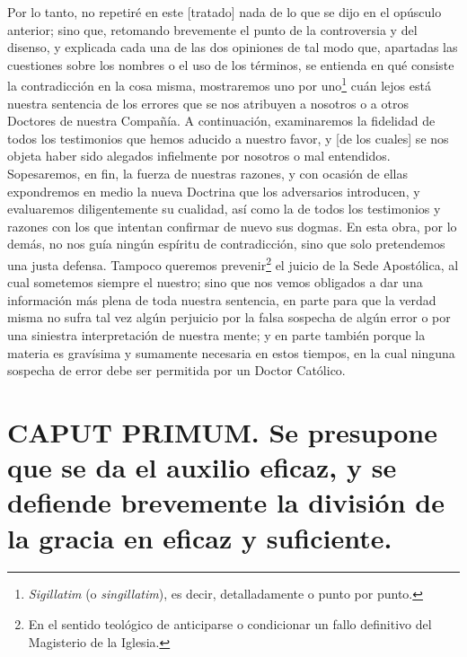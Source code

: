 \documentclass{article}
\begin{document}
Por lo tanto, no repetiré en este [tratado] nada de lo que se dijo en el opúsculo
anterior; sino que, retomando brevemente el punto de la controversia y del disenso, y
explicada cada una de las dos opiniones de tal modo que, apartadas las cuestiones sobre
los nombres o el uso de los términos, se entienda en qué consiste la contradicción en la
cosa misma, mostraremos uno por uno\footnote{\textit{Sigillatim} (o
\textit{singillatim}), es decir, detalladamente o punto por punto.} cuán lejos está
nuestra sentencia de los errores que se nos atribuyen a nosotros o a otros Doctores de
nuestra Compañía. A continuación, examinaremos la fidelidad de todos los testimonios que
hemos aducido a nuestro favor, y [de los cuales] se nos objeta haber sido alegados
infielmente por nosotros o mal entendidos. Sopesaremos, en fin, la fuerza de nuestras
razones, y con ocasión de ellas expondremos en medio la nueva Doctrina que los
adversarios introducen, y evaluaremos diligentemente su cualidad, así como la de todos
los testimonios y razones con los que intentan confirmar de nuevo sus dogmas. En esta
obra, por lo demás, no nos guía ningún espíritu de contradicción, sino que solo
pretendemos una justa defensa. Tampoco queremos prevenir\footnote{En el sentido
teológico de anticiparse o condicionar un fallo definitivo del Magisterio de la
Iglesia.} el juicio de la Sede Apostólica, al cual sometemos siempre el nuestro; sino
que nos vemos obligados a dar una información más plena de toda nuestra sentencia, en
parte para que la verdad misma no sufra tal vez algún perjuicio por la falsa sospecha de
algún error o por una siniestra interpretación de nuestra mente; y en parte también
porque la materia es gravísima y sumamente necesaria en estos tiempos, en la cual
ninguna sospecha de error debe ser permitida por un Doctor Católico.

\section{CAPUT PRIMUM. Se presupone que se da el auxilio eficaz, y se defiende
brevemente la división de la gracia en eficaz y suficiente.}
\end{document}
